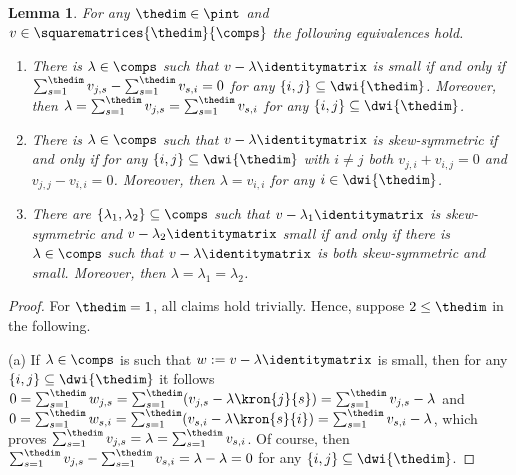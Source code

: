 \documentclass[pdftex]{sigma}
\numberwithin{equation}{section}
\newtheorem{Lemma}[Theorem]{Lemma}
\begin{document}
{
  \newcommand{\themat}{v}
  \newcommand{\thematx}[2]{v_{#1,#2}}
  \newcommand{\indi}{i}
  \newcommand{\indj}{j}
  \newcommand{\inds}{s}
  \newcommand{\thesum}{\lambda}
  \newcommand{\firstsum}{\lambda_1}
  \newcommand{\secondsum}{\lambda_2}
\begin{Lemma}
  \label{lemma:small-skewsymmetric-both}
  For any $\thedim\in\pint$ and $\themat\in\squarematrices{\thedim}{\comps}$ the following equivalences hold.
  \begin{enumerate}
  \item\label{lemma:small-skewsymmetric-both-1} There is $\thesum\in\comps$ such that $\themat-\thesum\identitymatrix$ is small if and only if $\sum_{\inds=1}^\thedim\thematx{\indj}{\inds}-\sum_{\inds=1}^\thedim\thematx{\inds}{\indi}=0$ for any $\{\indi,\indj\}\subseteq \dwi{\thedim}$. Moreover, then $\thesum=\sum_{\inds=1}^\thedim\thematx{\indj}{\inds}=\sum_{\inds=1}^\thedim\thematx{\inds}{\indi}$ for any $\{\indi,\indj\}\subseteq \dwi{\thedim}$.
  \item\label{lemma:small-skewsymmetric-both-2} There is $\thesum\in\comps$ such that $\themat-\thesum\identitymatrix$ is skew-symmetric  if and only if for any $\{\indi,\indj\}\subseteq \dwi{\thedim}$ with $\indi\neq \indj$ both  $\thematx{\indj}{\indi}+\thematx{\indi}{\indj}=0$ and $\thematx{\indj}{\indj}-\thematx{\indi}{\indi}=0$.
    Moreover, then $\thesum=\thematx{\indi}{\indi}$ for any $\indi\in\dwi{\thedim}$.
  \item\label{lemma:small-skewsymmetric-both-3} There are $\{\firstsum,\secondsum\}\subseteq\comps$ such that $\themat-\firstsum\identitymatrix$ is skew-symmetric and $\themat-\secondsum\identitymatrix$  small if and only if there is $\thesum\in\comps$ such that $\themat-\thesum\identitymatrix$ is both skew-symmetric and small. Moreover, then $\thesum=\firstsum=\secondsum$.
  \end{enumerate}
\end{Lemma}
\begin{proof}
  \newcommand{\auxmat}{w}
  \newcommand{\auxmatx}[2]{w_{#1,#2}}
  For $\thedim=1$, all claims  hold trivially. Hence, suppose $2\leq \thedim$ in the following.

  (a)
  If $\thesum\in\comps$ is such that $\auxmat:=\themat-\thesum\identitymatrix$ is  small, then for any $\{\indi,\indj\}\subseteq\dwi{\thedim}$ it follows $0=\sum_{\inds=1}^\thedim\auxmatx{\indj}{\inds}=\sum_{\inds=1}^\thedim(\thematx{\indj}{\inds}-\thesum\kron{\indj}{\inds})=\sum_{\inds=1}^\thedim\thematx{\indj}{\inds}-\thesum$ and $0=\sum_{\inds=1}^\thedim\auxmatx{\inds}{\indi}=\sum_{\inds=1}^\thedim(\thematx{\inds}{\indi}-\thesum\kron{\inds}{\indi})=\sum_{\inds=1}^\thedim\thematx{\inds}{\indi}-\thesum$, which proves $\sum_{\inds=1}^\thedim\thematx{\indj}{\inds}=\thesum=\sum_{\inds=1}^\thedim\thematx{\inds}{\indi}$. Of course, then $\sum_{\inds=1}^\thedim\thematx{\indj}{\inds}-\sum_{\inds=1}^\thedim\thematx{\inds}{\indi}=\thesum-\thesum=0$ for any $\{\indi,\indj\}\subseteq \dwi{\thedim}$.


\end{proof}}
\end{document}
